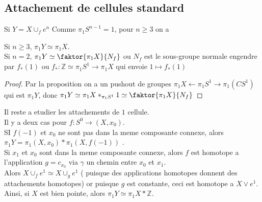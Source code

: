 \documentclass[../main.tex]{subfiles}
\begin{document}
\subsection{Attachement de cellules standard}
Si $ Y = X\cup_f e^{n}$ Comme $\pi_1 S^{n-1}= 1 $, pour $n \geq 3$ on a 
\begin{crly}
Si $n \geq 3$, $\pi_1 Y \simeq \pi_1 X$.\\
Si $ n=2$, $\pi_1 Y\simeq \faktor{ \pi_1 X}{N_f}$ ou $N_f$ est le sous-groupe normale engendre par $f_\ast ( 1) $ ou $f_\ast: \mathbb{Z} \simeq \pi_1 S^{1}\to \pi_1 X	$ qui envoie $1 \mapsto f_\ast( 1) $ 
\end{crly}
\begin{proof}
Par la proposition on a un pushout de groupes $ \pi_1 X \leftarrow \pi_1 S^{1} \rightarrow \pi_1( CS^{1}) $ qui est $\pi_1Y$, donc $\pi_1  Y \simeq \pi_1 X \ast_{\pi_1 S^{1}} 1\simeq \faktor { \pi_1 X} { N_f} $ 
\end{proof}
Il reste a etudier les attachements de $1$ cellule.\\
Il y a deux cas pour $f: S^{0}\to ( X,x_0 )$.\\
SI $f( -1) $ et $x_0$ ne sont pas dans la meme composante connexe, alors $\pi_1 Y= \pi_1( X,x_0) \ast \pi_1 ( X,f( -1) ) $ .\\
Si $x_1$ et $x_0$ sont dans la meme composante connexe, alors $f$ est homotope a l'application $g = c_{x_0} $ via $\gamma$ un chemin entre $x_0$ et $x_1$.\\
Alors $X\cup_f e^{1}\simeq X\cup_g e^{1}$ ( puisque des applications homotopes donnent des attachements homotopes) or puisque $g$ est constante, ceci est homotope a $X\vee e^{1}$.\\
Ainsi, si $X$ est bien pointe, alors $\pi_1Y \simeq \pi_1X \ast \mathbb{Z}$.
\end{document}
